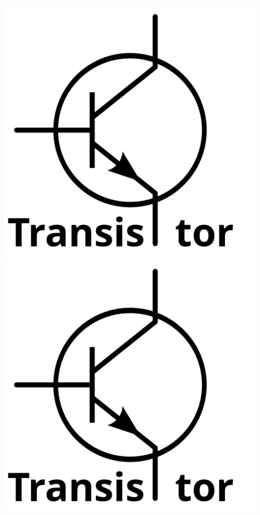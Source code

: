 \documentclass{scrartcl}
\begin{document}
{\begin{minipage}{\textwidth}
			\includegraphics[scale=0.07]{transa.png}
			\includegraphics[scale=0.07]{transa.png}

\end{minipage}}
\end{document}
